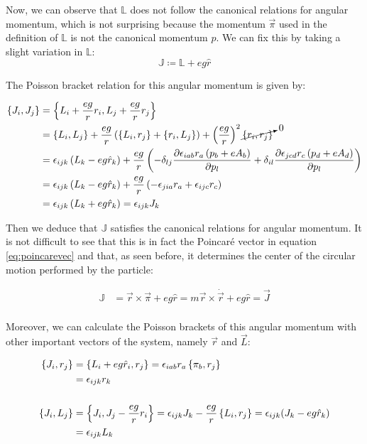 Now, we can observe that $\mathbb{L}$ does not follow the canonical relations for angular momentum, which is not surprising because the momentum $\vec{\pi}$ used in the definition of $\mathbb{L}$ is not the canonical momentum $p$. We can fix this by taking a slight variation in $\mathbb{L}$:\\

\begin{equation}
\mathbb{J} \coloneqq \mathbb{L} + eg\hat{r}
\label{eq:ham poincarevec}
\end{equation}

The Poisson bracket relation for this angular momentum is given by:

\begin{align*}
\left\lbrace J_i, J_j \right\rbrace &= \left\lbrace L_i + \frac{eg}{r}r_i, L_j + \frac{eg}{r}r_j \right\rbrace\\
&= \left\lbrace L_i, L_j \right\rbrace + \frac{eg}{r}\left( \left\lbrace L_i, r_j \right\rbrace +\left\lbrace r_i, L_j \right\rbrace \right) + \left( \frac{eg}{r} \right)^2\cancelto{0}{\left\lbrace r_i, r_j \right\rbrace}\\
& = \epsilon_{ijk}\left( L_k-{eg}\hat{r}_k \right)+\frac{eg}{r}\left( -\delta_{lj}\frac{\partial \epsilon_{iab}r_a\left( p_b+eA_b \right)}{\partial p_l}+ \delta_{il}\frac{\partial\epsilon_{jcd}r_c\left( p_d+eA_d \right)}{\partial p_l} \right)\\
& = \epsilon_{ijk}\left( L_k-{eg}\hat{r}_k \right)+ \frac{eg}{r}\left( -\epsilon_{jia}r_a+\epsilon_{ijc}r_c \right)\\
&= \epsilon_{ijk}\left( L_k+{eg}\hat{r}_k \right) = \epsilon_{ijk}J_k
\end{align*}

Then we deduce that $\mathbb{J}$ satisfies the canonical relations for angular momentum. It is not difficult to see that this is in fact the Poincar\'e vector in equation \eqref{eq:poincarevec} and that, as seen before, it determines the center of the circular motion performed by the particle:

\begin{align*}
\mathbb{J} &= \vec{r}\times\vec{\pi}+{eg}\hat{r} = m{\vec{r}}\times\dot{\vec{r}} + eg\hat{r} = \vec{J}\\ 
\end{align*}

Moreover, we can calculate the Poisson brackets of this angular momentum with other important vectors of the system, namely $\vec{r}$ and $\vec{L}$:

\begin{align*}
\left\lbrace J_i, r_j \right\rbrace &= \left\lbrace L_i+eg\hat{r}_i, r_j \right\rbrace =  \epsilon_{iab}r_a\left\lbrace \pi_b, r_j \right\rbrace \\
&= \epsilon_{ijk}r_k\\
\\
\left\lbrace J_i, L_j \right\rbrace &= \left\lbrace J_i, J_j-\frac{eg}{r}r_i \right\rbrace = \epsilon_{ijk}J_k-\frac{eg}{r}\left\lbrace L_i, r_j \right\rbrace =\epsilon_{ijk}(J_k-eg\hat{r}_k) \\
&= \epsilon_{ijk}L_k\\
\end{align*}

